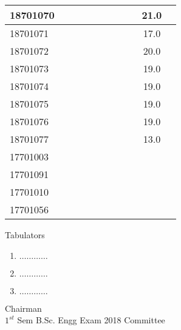 \documentclass[12pt]{article}
\begin{document}
\begin{center}
\begin{small}
\begin{tabular}{|l|c|c|c|c|c|c|c|c|c|c|}
18701070 &  &  &  &  &  &  &  &  & 21.0\\ \hline 
18701071 &  &  &  &  &  &  &  &  & 17.0\\ \hline 
18701072 &  &  &  &  &  &  &  &  & 20.0\\ \hline 
18701073 &  &  &  &  &  &  &  &  & 19.0\\ \hline 
18701074 &  &  &  &  &  &  &  &  & 19.0\\ \hline 
18701075 &  &  &  &  &  &  &  &  & 19.0\\ \hline 
18701076 &  &  &  &  &  &  &  &  & 19.0\\ \hline 
18701077 &  &  &  &  &  &  &  &  & 13.0\\ \hline 
17701003 &  &  &  &  &  &  &  &  & \\ \hline 
17701091 &  &  &  &  &  &  &  &  & \\ \hline 
17701010 &  &  &  &  &  &  &  &  & \\ \hline 
17701056 &  &  &  &  &  &  &  &  & \\ \hline 
        \end{tabular}
            \end{small}
            \end{center}
  \centering
            
            \begin{table}[hb]
            	\centering
            \begin{minipage}[b]{0.5\linewidth} %
            {\centering Tabulators }
            \begin{enumerate}
                \item  \hspace*{1ex} $\ldots \ldots \ldots \ldots$  
                \item  \hspace*{1ex} $\ldots \ldots \ldots \ldots$  
                \item  \hspace*{1ex} $\ldots \ldots \ldots \ldots$  
            \end{enumerate} 

            \end{minipage}
            \hspace*{1.2cm}
            \begin{minipage}[b]{0.4\linewidth} \centering
            Chairman  \hspace*{1ex} \\
           $1^{st}$ Sem B.Sc. Engg Exam 2018 Committee
            \end{minipage}
            \end{table}
            \clearpage
            
\end{document}
